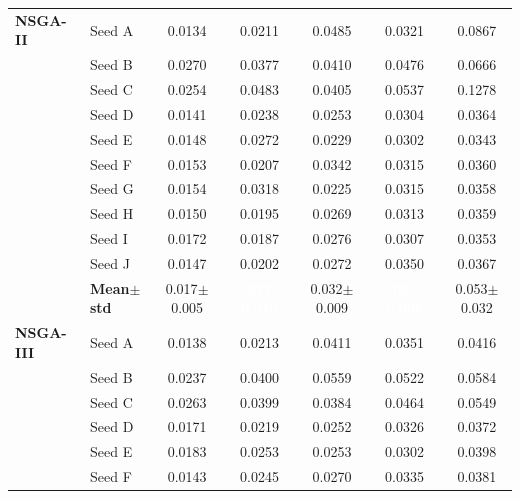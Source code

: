 \begin{table}[H]
{\begin{tabular}{@{}llccccc@{}}
\midrule
 \textbf{NSGA-II} & Seed A & {\small 0.0134} & {\small 0.0211} & {\small 0.0485} & {\small 0.0321} & {\small 0.0867} \\
  & Seed B & {\small 0.0270} & {\small 0.0377} & {\small 0.0410} & {\small 0.0476} & {\small 0.0666} \\
  & Seed C & {\small 0.0254} & {\small 0.0483} & {\small 0.0405} & {\small 0.0537} & {\small 0.1278} \\
  & Seed D & {\small 0.0141} & {\small 0.0238} & {\small 0.0253} & {\small 0.0304} & {\small 0.0364} \\
  & Seed E & {\small 0.0148} & {\small 0.0272} & {\small 0.0229} & {\small 0.0302} & {\small 0.0343} \\
  & Seed F & {\small 0.0153} & {\small 0.0207} & {\small 0.0342} & {\small 0.0315} & {\small 0.0360} \\
  & Seed G & {\small 0.0154} & {\small 0.0318} & {\small 0.0225} & {\small 0.0315} & {\small 0.0358} \\
  & Seed H & {\small 0.0150} & {\small 0.0195} & {\small 0.0269} & {\small 0.0313} & {\small 0.0359} \\
  & Seed I & {\small 0.0172} & {\small 0.0187} & {\small 0.0276} & {\small 0.0307} & {\small 0.0353} \\
  & Seed J & {\small 0.0147} & {\small 0.0202} & {\small 0.0272} & {\small 0.0350} & {\small 0.0367} \\
 & \textbf{Mean$\pm$std} & \cellcolor{ForestGreen!25}0.017$\pm$0.005 & \cellcolor{ForestGreen!55}\textcolor{white}{\textbf{0.027$\pm$0.010}} & \cellcolor{ForestGreen!25}0.032$\pm$0.009 & \cellcolor{ForestGreen!55}\textcolor{white}{\textbf{0.035$\pm$0.008}} & \cellcolor{ForestGreen!25}0.053$\pm$0.032 \\
\midrule
 \textbf{NSGA-III} & Seed A & {\small 0.0138} & {\small 0.0213} & {\small 0.0411} & {\small 0.0351} & {\small 0.0416} \\
  & Seed B & {\small 0.0237} & {\small 0.0400} & {\small 0.0559} & {\small 0.0522} & {\small 0.0584} \\
  & Seed C & {\small 0.0263} & {\small 0.0399} & {\small 0.0384} & {\small 0.0464} & {\small 0.0549} \\
  & Seed D & {\small 0.0171} & {\small 0.0219} & {\small 0.0252} & {\small 0.0326} & {\small 0.0372} \\
  & Seed E & {\small 0.0183} & {\small 0.0253} & {\small 0.0253} & {\small 0.0302} & {\small 0.0398} \\
  & Seed F & {\small 0.0143} & {\small 0.0245} & {\small 0.0270} & {\small 0.0335} & {\small 0.0381} \\

\end{tabular}}
\end{table}
